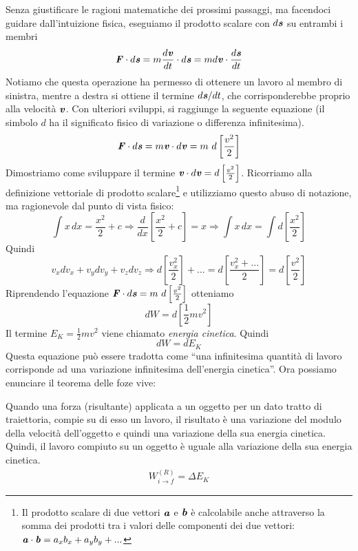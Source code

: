 \noindent Senza giustificare le ragioni matematiche dei prossimi passaggi, ma facendoci
guidare dall'intuizione fisica, eseguiamo il prodotto scalare con $d\textbf{\textit{s}}$
su entrambi i membri
\[ \textbf{\textit{F}}\cdot d\textbf{\textit{s}} = m\frac{d\textbf{\textit{v}}}{dt}\cdot d\textbf{\textit{s}} = m d\textbf{\textit{v}}\cdot\frac{d\textbf{\textit{s}}}{dt} \]
Notiamo che questa operazione ha permesso di ottenere un lavoro al membro di
sinistra, mentre a destra si ottiene il termine $d\textbf{\textit{s}}/dt$, che corrisponderebbe
proprio alla velocità $\textbf{\textit{v}}$. Con ulteriori sviluppi, si raggiunge la
seguente equazione (il simbolo $d$ ha il significato fisico di variazione o
differenza infinitesima).
\[ \textbf{\textit{F}}\cdot d\textbf{\textit{s}} = m\textbf{\textit{v}}\cdot d\textbf{\textit{v}} = m\text{ }d\left[\frac{v^2}{2}\right] \]
Dimostriamo come sviluppare il termine $\textbf{\textit{v}}\cdot d\textbf{\textit{v}} = d\left[\frac{v^2}{2}\right]$.
Ricorriamo alla definizione vettoriale di prodotto scalare\footnote{Il prodotto scalare
di due vettori $\textbf{\textit{a}}$ e $\textbf{\textit{b}}$ è calcolabile anche attraverso la somma
dei prodotti tra i valori delle componenti dei due vettori: $\textbf{\textit{a}}\cdot\textbf{\textit{b}} = a_xb_x + a_yb_y + ...$}
e utilizziamo questo abuso di notazione, ma ragionevole dal punto di vista fisico:
\[ \int x \,dx =  \frac{x^2}{2} + c \Rightarrow \frac{d}{dx}\left[\frac{x^2}{2} + c\right] = x \Rightarrow \int x \,dx = \int d\left[\frac{x^2}{2}\right] \]
Quindi
\[ v_x dv_x + v_y dv_y + v_z dv_z \Rightarrow d\left[\frac{v_x^2}{2}\right] + ... = d\left[\frac{v_x^2 + ...}{2}\right] = d\left[\frac{v^2}{2}\right] \]
Riprendendo l'equazione $\textbf{\textit{F}}\cdot d\textbf{\textit{s}} = m\text{ }d\left[\frac{v^2}{2}\right]$ otteniamo
\[ dW = d\left[\frac12 mv^2\right] \]
Il termine $E_K = \frac{1}{2}mv^2$ viene chiamato \textit{energia cinetica}. Quindi
\[ dW = dE_K \]
Questa equazione può essere tradotta come ``una infinitesima quantità di lavoro
corrisponde ad una variazione infinitesima dell'energia cinetica''. Ora possiamo
enunciare il teorema delle foze vive:
\vspace{8pt}
\begin{tcolorbox}[colback = red!30, colframe = red!30!black, title = {Teorema dell'energia cinetica (o delle forze vive)}]
    Quando una forza (risultante) applicata a un oggetto per un dato tratto di
    traiettoria, compie su di esso un lavoro, il risultato è una variazione del
    modulo della velocità dell'oggetto e quindi una variazione della sua energia
    cinetica. Quindi, il lavoro compiuto su un oggetto è uguale alla variazione
    della sua energia cinetica.
    \begin{align}
        W_{i\to f}^{(R)} = \Delta E_K\label{forzevive}
    \end{align}
\end{tcolorbox}
\vspace{5pt}


